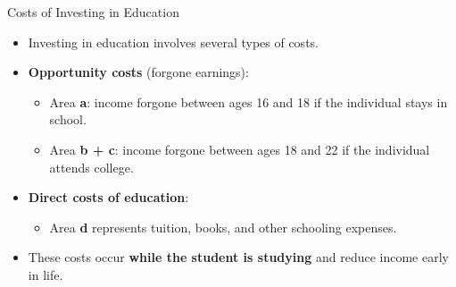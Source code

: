 \documentclass[aspectratio=169]{beamer}
\begin{document}
\begin{frame}{Costs of Investing in Education}
\transfade

\begin{itemize}

\item Investing in education involves several types of costs.

\item \textbf{Opportunity costs} (forgone earnings):

\begin{itemize}

\item Area \textbf{a}: income forgone between ages 16 and 18 if the individual stays in school.

\item Area \textbf{b + c}: income forgone between ages 18 and 22 if the individual attends college.

\end{itemize}

\item \textbf{Direct costs of education}:

\begin{itemize}

\item Area \textbf{d} represents tuition, books, and other schooling expenses.

\end{itemize}

\item These costs occur \textbf{while the student is studying} and reduce income early in life.

\end{itemize}

\end{frame}
\end{document}
